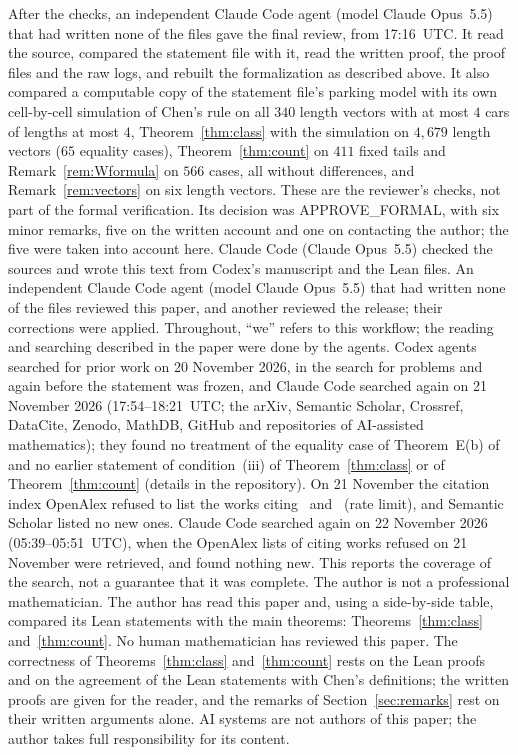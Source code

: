 \documentclass[11pt]{article}
\theoremstyle{remark}
\begin{document}
After the checks, an independent Claude Code agent (model Claude Opus~5.5)
that had written none of the files gave the final review, from 17:16~UTC. It
read the source, compared the statement file with it, read the written proof,
the proof files and the raw logs, and rebuilt the formalization as described
above. It also compared a computable copy of the
statement file's parking model with its own cell-by-cell simulation of Chen's
rule on all $340$ length vectors with at most $4$ cars of lengths at most $4$,
Theorem~\ref{thm:class} with the simulation on $4{,}679$ length vectors ($65$
equality cases), Theorem~\ref{thm:count} on $411$ fixed tails and
Remark~\ref{rem:Wformula} on $566$ cases, all without differences, and Remark~\ref{rem:vectors} on six
length vectors. These are the reviewer's checks, not part of the formal verification. Its
decision
was APPROVE\_FORMAL, with six minor remarks, five on the written account and
one on contacting the author; the five were taken into account here. Claude Code (Claude Opus~5.5) checked the sources and
wrote this text from Codex's manuscript and the Lean files. An independent Claude Code agent (model Claude Opus~5.5) that had written none of the files reviewed this paper, and another reviewed the release; their corrections were applied.
Throughout, ``we'' refers to this workflow; the reading and searching described
in the paper were done by the agents. Codex agents searched for prior work on 20 November 2026, in the search for problems and again before the statement was frozen, and Claude Code searched again on 21 November 2026 (17:54--18:21~UTC; the arXiv, Semantic Scholar, Crossref, DataCite, Zenodo, MathDB, GitHub and repositories of AI-assisted mathematics); they found no treatment of the equality case of Theorem~E(b) of~\cite{chen} and no earlier statement of condition~(iii) of Theorem~\ref{thm:class} or of Theorem~\ref{thm:count} (details in the repository). On 21 November the citation index OpenAlex refused to list the works citing~\cite{chen} and~\cite{chmps} (rate limit), and Semantic Scholar listed no new ones. Claude Code searched again on 22 November 2026 (05:39--05:51~UTC), when the OpenAlex lists of citing works refused on 21 November were retrieved, and found nothing new. This reports the
coverage of the search, not a guarantee that it was complete. The author is not
a professional mathematician. The author has read this paper and, using a side-by-side table, compared its Lean statements with the main theorems: Theorems~\ref{thm:class} and~\ref{thm:count}. No human mathematician has reviewed
this paper. The correctness of Theorems~\ref{thm:class} and~\ref{thm:count}
rests on the Lean proofs and on the agreement of the Lean statements with
Chen's definitions; the written proofs are given for the reader, and the
remarks of Section~\ref{sec:remarks} rest on their written arguments alone. AI
systems are not authors of this paper; the author takes full responsibility for
its content.
\end{document}
